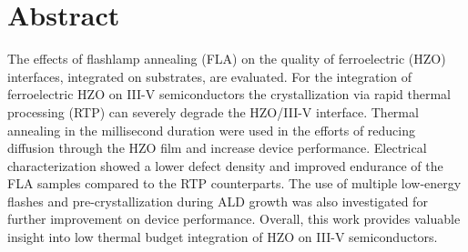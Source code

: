 \documentclass[11pt,twoside,final]{eitExjobb}  %
\begin{document}
\MakeTitlePage{}  %
\frontmatter    %
\chapter*{Abstract}
The effects of flashlamp annealing (FLA) on the quality of ferroelectric
 (HZO) interfaces, integrated on  substrates, are
evaluated. For the integration of ferroelectric HZO on III-V semiconductors the
crystallization via rapid thermal processing (RTP) can severely degrade the
HZO/III-V interface. Thermal annealing in the millisecond duration were used in
the efforts of reducing diffusion through the HZO film and increase device
performance. Electrical characterization showed a lower defect density and
improved endurance of the FLA samples compared to the RTP counterparts. The use
of multiple low-energy flashes and pre-crystallization during ALD growth was
also investigated for further improvement on device performance. Overall, this
work provides valuable insight into low thermal budget integration of HZO on
III-V semiconductors.
\end{document}
